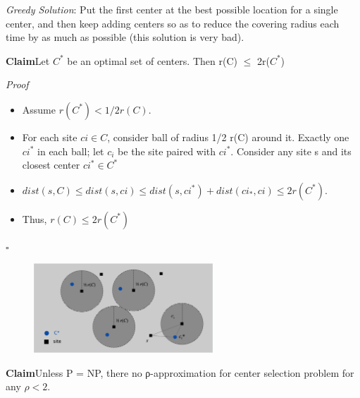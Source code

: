 \documentclass[11pt]{article}
\newenvironment{claim}[1]{\par\textbf{Claim}\space#1}{}
\newenvironment{proof}[1]{\par\textit{Proof}\space#1}{\hfill\ensuremath{\square}}
\begin{document}
\emph{Greedy Solution}: Put the first center at the best possible location for a single center, and then keep adding centers so as to reduce the covering radius each time by as much as possible (this solution is very bad).\\

\begin{claim}
Let $C^{*}$ be an optimal set of centers. Then r(C) $\leq$ 2r($C^{*}$)
\end{claim}

\begin{proof}
\begin{itemize}
\item{Assume $r(C^{*}) < 1/2 r(C)$}.
\item{For each site $ci \in C$, consider ball of radius 1/2 r(C) around it. Exactly one $ci^{*}$ in each ball; let $c_{i}$ be the site paired with $ci^{*}$. Consider any site s and its closest center $ci^{*} ∈ C^{*}$}
\item{$dist(s, C) \leq dist(s, ci) \leq dist(s, ci^{*}) + dist(ci_{*}, ci) \leq 2r(C^{*}).$}
\item{Thus, $r(C) \leq 2r(C^{*})$}
\end{itemize}
\end{proof}

\begin{figure}[H]
		\centering
		\includegraphics[width=0.6\textwidth ]{kCenterDemonstration}
\end{figure}

\begin{claim}
Unless P = NP, there no ρ-approximation for center selection problem for any $ρ < 2$.
\end{claim}\\
\end{document}
